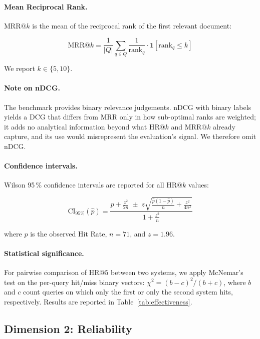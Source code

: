 \documentclass{iosart2x}
\makeatletter
\newcommand{\HR}[1]{\text{HR}@{#1}}
\newcommand{\MRR}[1]{\text{MRR}@{#1}}
\makeatother
\begin{document}
\paragraph{Mean Reciprocal Rank.}  $\MRR{k}$ is the mean of the
reciprocal rank of the first relevant document:

\begin{equation}
  \label{eq:mrr}
  \MRR{k} = \frac{1}{|Q|}\sum_{q \in Q}
    \frac{1}{\mathrm{rank}_q}\cdot
    \mathbf{1}\!\left[\mathrm{rank}_q \leq k\right]
\end{equation}

We report $k \in \{5, 10\}$.

\paragraph{Note on nDCG.}  The benchmark provides binary relevance
judgements.  nDCG with binary labels yields a DCG that differs from
MRR only in how sub-optimal ranks are weighted; it adds no analytical
information beyond what $\HR{k}$ and $\MRR{k}$ already capture, and
its use would misrepresent the evaluation's signal.  We therefore omit
nDCG.

\paragraph{Confidence intervals.}  Wilson 95\,\% confidence intervals
are reported for all $\HR{k}$ values:

\begin{equation}
  \label{eq:wilson}
  \mathrm{CI}_{95\%}(\hat{p}) =
    \frac{\hat{p} + \frac{z^2}{2n}
    \;\pm\;
    z\sqrt{\frac{\hat{p}(1-\hat{p})}{n} + \frac{z^2}{4n^2}}}
    {1 + \frac{z^2}{n}}
\end{equation}

\noindent where $\hat{p}$ is the observed Hit Rate, $n{=}71$, and
$z{=}1.96$.

\paragraph{Statistical significance.}  For pairwise comparison of
$\HR{5}$ between two systems, we apply McNemar's test on the
per-query hit/miss binary vectors:
$\chi^2 = (b-c)^2/(b+c)$, where $b$ and $c$ count queries on which
only the first or only the second system hits, respectively.  Results
are reported in Table~\ref{tab:effectiveness}.

\subsection{Dimension 2: Reliability}
\label{sec:eval-reliability}
\end{document}
